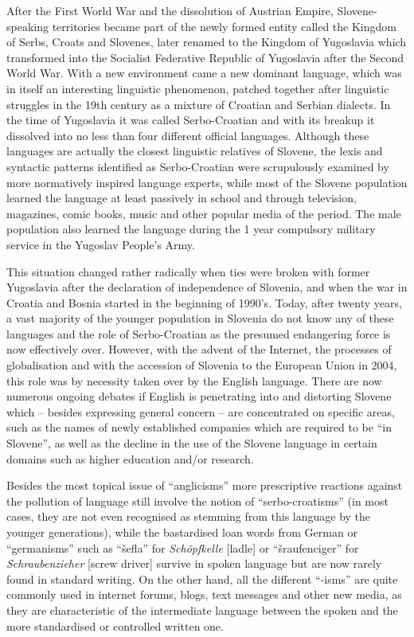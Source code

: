 \begin{multicols}{2}
After the First World War and the dissolution of Austrian Empire, Slovene-speaking territories became part of the newly formed entity called the Kingdom of Serbs, Croats and Slovenes, later renamed to the Kingdom of Yugoslavia which transformed into the Socialist Federative Republic of Yugoslavia after the Second World War. With a new environment came a new dominant language, which was in itself an interesting linguistic phenomenon, patched together after linguistic struggles in the 19th century as a mixture of Croatian and Serbian dialects. In the time of Yugoslavia it was called Serbo-Croatian and with its breakup it dissolved into no less than four different official languages. Although these languages are actually the closest linguistic relatives of Slovene, the lexis and syntactic patterns identified as Serbo-Croatian were scrupulously examined by more normatively inspired language experts, while most of the Slovene population learned the language at least passively in school and through television, magazines, comic books, music and other popular media of the period. The male population also learned the language during the 1 year compulsory military service in the Yugoslav People's Army.


This situation changed rather radically when ties were broken with former Yugoslavia after the declaration of independence of Slovenia, and when the war in Croatia and Bosnia started in the beginning of 1990's. Today, after twenty years, a vast majority of the younger population in Slovenia do not know any of these languages and the role of Serbo-Croatian as the presumed endangering force is now effectively over. However, with the advent of the Internet, the processes of globalisation and with the accession of Slovenia to the European Union in 2004, this role was by necessity taken over by the English language. There are now numerous ongoing debates if English is penetrating into and distorting Slovene which – besides expressing general concern – are concentrated on specific areas, such as the names of newly established companies which are required to be ``in Slovene'', as well as the decline in the use of the Slovene language in certain domains such as higher education and/or research. 

Besides the most topical issue of ``anglicisms'' more prescriptive reactions against the pollution of language still involve the notion of ``serbo-croatisms'' (in most cases, they are not even recognised as stemming from this language by the younger generations), while the bastardised loan words from German or ``germanisms'' such as ``šefla'' for \textit{Schöpfkelle} [ladle] or ``šraufenciger'' for \textit{Schraubenzieher} [screw driver] survive in spoken language but are now rarely found in standard writing. On the other hand, all the different ``-isms'' are quite commonly used in internet forums, blogs, text messages and other new media, as they are characteristic of the intermediate language between the spoken and the more standardised or controlled written one.


\end{multicols}
